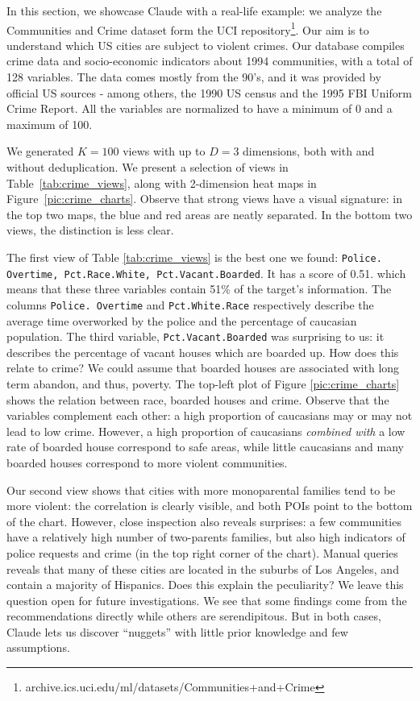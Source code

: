 In this section, we showcase Claude with a real-life example: we analyze the
Communities and Crime dataset form the UCI
repository\footnote{archive.ics.uci.edu/ml/datasets/Communities+and+Crime}.
Our aim is to understand which US cities are subject to violent crimes. Our
database compiles crime data and socio-economic indicators about 1994
communities, with a total of 128 variables. The data comes mostly from the
90's, and it was provided by official US sources - among others, the 1990 US
census and the 1995 FBI Uniform Crime Report. All the variables are normalized
to have a minimum of 0 and a maximum of 100.

We generated $K=100$ views with up to $D=3$ dimensions, both with and
without deduplication. We present a selection of views in
Table~\ref{tab:crime_views}, along with 2-dimension heat maps in
Figure~\ref{pic:crime_charts}. Observe that strong views have a visual
signature: in the top two maps, the blue and red areas are neatly separated. In
the bottom two views, the distinction is less clear.

The first view of Table \ref{tab:crime_views} is the best one we found:
\texttt{Police. Overtime, Pct.Race.White, Pct.Vacant.Boarded}. It has a score
of 0.51. which means that these three variables contain 51\% of the target's
information. The columns \texttt{Police. Overtime} and \texttt{Pct.White.Race}
respectively describe the average time overworked by the police and the
percentage of caucasian population. The third variable,
\texttt{Pct.Vacant.Boar\-ded} was surprising to us: it describes the
percentage of vacant houses which are boarded up.  How does this relate to
crime? We could assume that boarded houses are associated with long term
abandon, and thus, poverty. The top-left plot of Figure \ref{pic:crime_charts}
shows the relation between race, boarded houses and crime. Observe that the
variables complement each other: a high proportion of caucasians may or may not
lead to low crime. However, a high proportion of caucasians \emph{combined
with} a low rate of boarded house correspond to safe areas, while little
caucasians and many boarded houses correspond to more violent communities.

Our second view shows that cities with more monoparental families tend to be
more violent: the correlation is clearly visible, and both POIs point to the
bottom of the chart. However, close inspection also reveals surprises: a few
communities have a relatively high number of two-parents families, but also
high indicators of police requests and crime (in the top right corner of the
chart). Manual queries reveals that many of these cities are located in the
suburbs of Los Angeles, and contain a majority of Hispanics. Does this explain
the peculiarity? We leave this question open for future investigations. We see
that some findings come from the recommendations directly while others are
serendipitous.  But in both cases, Claude lets us discover ``nuggets'' with
little prior knowledge and few assumptions. 

